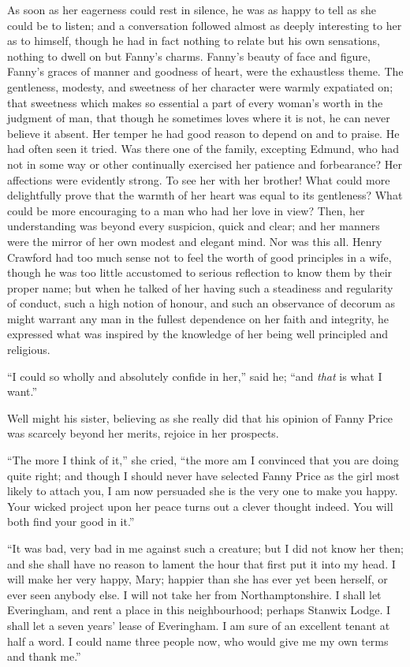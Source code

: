 \documentclass{article}
\begin{document}
As soon as her eagerness could rest in silence,
he was as happy to tell as she could be to listen;
and a conversation followed almost as deeply interesting
to her as to himself, though he had in fact nothing
to relate but his own sensations, nothing to dwell on
but Fanny's charms.  Fanny's beauty of face and figure,
Fanny's graces of manner and goodness of heart, were the
exhaustless theme.  The gentleness, modesty, and sweetness
of her character were warmly expatiated on; that sweetness
which makes so essential a part of every woman's worth
in the judgment of man, that though he sometimes loves
where it is not, he can never believe it absent.
Her temper he had good reason to depend on and to praise.
He had often seen it tried.  Was there one of the family,
excepting Edmund, who had not in some way or other
continually exercised her patience and forbearance?
Her affections were evidently strong.  To see her with
her brother!  What could more delightfully prove that
the warmth of her heart was equal to its gentleness?
What could be more encouraging to a man who had her love
in view?  Then, her understanding was beyond every suspicion,
quick and clear; and her manners were the mirror of
her own modest and elegant mind.  Nor was this all.
Henry Crawford had too much sense not to feel the worth of good
principles in a wife, though he was too little accustomed
to serious reflection to know them by their proper name;
but when he talked of her having such a steadiness
and regularity of conduct, such a high notion of honour,
and such an observance of decorum as might warrant any man
in the fullest dependence on her faith and integrity,
he expressed what was inspired by the knowledge of her
being well principled and religious.

``I could so wholly and absolutely confide in her,'' said he;
``and \emph{that} is what I want.''

Well might his sister, believing as she really did that his
opinion of Fanny Price was scarcely beyond her merits,
rejoice in her prospects.

``The more I think of it,'' she cried, ``the more am I convinced
that you are doing quite right; and though I should never have
selected Fanny Price as the girl most likely to attach you,
I am now persuaded she is the very one to make you happy.
Your wicked project upon her peace turns out a clever
thought indeed.  You will both find your good in it.''

``It was bad, very bad in me against such a creature;
but I did not know her then; and she shall have no reason
to lament the hour that first put it into my head.
I will make her very happy, Mary; happier than she has ever
yet been herself, or ever seen anybody else.  I will not
take her from Northamptonshire.  I shall let Everingham,
and rent a place in this neighbourhood; perhaps Stanwix Lodge.
I shall let a seven years' lease of Everingham.
I am sure of an excellent tenant at half a word.
I could name three people now, who would give me my own
terms and thank me.''
\end{document}
